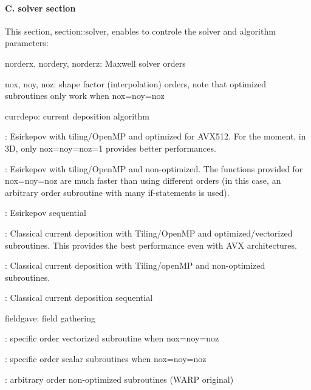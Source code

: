 \paragraph*{C. solver section}

This section, {\ttfamily section\+::solver}, enables to controle the solver and algorithm parameters\+:


\begin{DoxyItemize}
\item {\ttfamily norderx}, {\ttfamily nordery}, {\ttfamily norderz}\+: Maxwell solver orders
\item {\ttfamily nox}, {\ttfamily noy}, {\ttfamily noz}\+: shape factor (interpolation) orders, note that optimized subroutines only work when {\ttfamily nox=noy=noz}
\item {\ttfamily currdepo}\+: current deposition algorithm
\begin{DoxyItemize}
\item {}\+: Esirkepov with tiling/\+Open\+MP and optimized for A\+V\+X512. For the moment, in 3D, only {\ttfamily nox=noy=noz=1} provides better performances.
\item {}\+: Esirkepov with tiling/\+Open\+MP and non-\/optimized. The functions provided for {\ttfamily nox=noy=noz} are much faster than using different orders (in this case, an arbitrary order subroutine with many if-\/statements is used).
\item {}\+: Esirkepov sequential
\item {}\+: Classical current deposition with Tiling/\+Open\+MP and optimized/vectorized subroutines. This provides the best performance even with A\+VX architectures.
\item {}\+: Classical current deposition with Tiling/open\+MP and non-\/optimized subroutines.
\item {}\+: Classical current deposition sequential
\end{DoxyItemize}
\item {\ttfamily fieldgave}\+: field gathering
\begin{DoxyItemize}
\item {}\+: specific order vectorized subroutine when {\ttfamily nox=noy=noz}
\item {}\+: specific order scalar subroutines when {\ttfamily nox=noy=noz}
\item {}\+: arbitrary order non-\/optimized subroutines (W\+A\+RP original)
\end{DoxyItemize}

\end{DoxyItemize}
